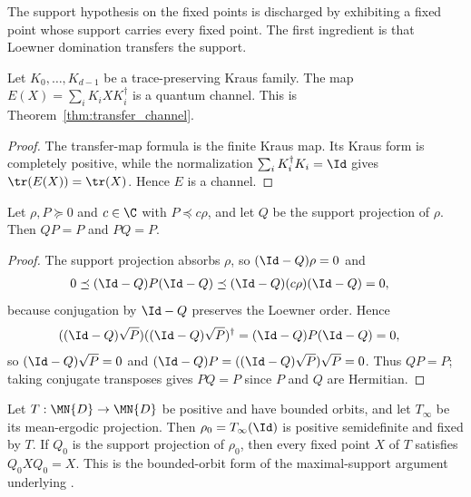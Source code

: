 The support hypothesis on the fixed points is discharged by exhibiting a
fixed point whose support carries every fixed point. The first ingredient is
that Loewner domination transfers the support.

\begin{lemma}%
    \label{lem:kraus_map_is_channel}
    \leanok
    Let $K_0,\ldots,K_{d-1}$ be a trace-preserving Kraus family. The map
    $E(X)=\sum_iK_iXK_i^\dagger$ is a quantum channel. This is
    Theorem~\ref{thm:transfer_channel}.
\end{lemma}

\begin{proof}\leanok
    The transfer-map formula is the finite Kraus map. Its Kraus form is
    completely positive, while the normalization
    $\sum_iK_i^\dagger K_i=\Id$ gives $\tr(E(X))=\tr(X)$. Hence $E$ is a
    channel.
\end{proof}

\begin{lemma}%
    \label{lem:stationaryProj_absorb_of_le}
    \leanok
    Let $\rho,P\succeq0$ and $c\in\C$ with $P\preceq c\rho$, and let $Q$
    be the support projection of $\rho$. Then $QP=P$ and $PQ=P$.
\end{lemma}

\begin{proof}
    \leanok
    The support projection absorbs $\rho$, so $(\Id-Q)\rho=0$ and
    \begin{align}
        0
         & \preceq(\Id-Q)P(\Id-Q)
        \preceq(\Id-Q)(c\rho)(\Id-Q)
        =0,
        \notag
    \end{align}
    because conjugation by $\Id-Q$ preserves the Loewner order. Hence
    \begin{align}
        ((\Id-Q)\sqrt{P})
        ((\Id-Q)\sqrt{P})^\dagger
         & =(\Id-Q)P(\Id-Q)=0,
        \notag
    \end{align}
    so $(\Id-Q)\sqrt{P}=0$ and
    $(\Id-Q)P=((\Id-Q)\sqrt{P})\sqrt{P}=0$. Thus $QP=P$; taking conjugate
    transposes gives $PQ=P$ since $P$ and $Q$ are Hermitian.
\end{proof}

\begin{theorem}%
    \label{thm:maximalSupport_fixedPoint_of_bounded_orbits}
    \leanok
    Let $T:\MN{D}\to\MN{D}$ be positive and have bounded orbits, and let
    $T_\infty$ be its mean-ergodic projection. Then
    $\rho_0=T_\infty(\Id)$ is positive semidefinite and fixed by $T$. If
    $Q_0$ is the support projection of $\rho_0$, then every fixed point $X$
    of $T$ satisfies $Q_0XQ_0=X$. This is the bounded-orbit form of the
    maximal-support argument underlying
    \cite[Proposition~6.9]{Wolf2012Quantum}.
\end{theorem}

